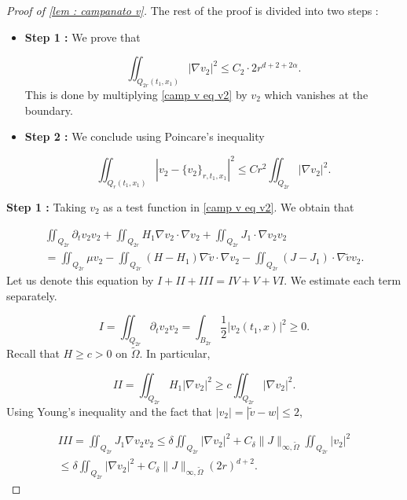 \documentclass[reqno,12pt,twoside]{amsart}
\numberwithin{equation}{section} \numberwithin{theorem}{section}
\numberwithin{proposition}{section} \numberwithin{lemma}{section}
\numberwithin{corollary}{section}
\numberwithin{definition}{section} \numberwithin{remark}{section}
\begin{document}
\begin{proof}[Proof of \autoref{lem : campanato v}]
The rest of the proof is divided into two steps : 

\begin{itemize}
\item[$\bullet$] \textbf{Step 1 :} We prove that 

\[\iint_{Q_{2r}(t_1, x_1)} |\nabla v_2|^2 \leqslant C_2\cdot  2r^{d+2+2\alpha}.\]
This is done by multiplying \eqref{camp v eq v2} by $v_2$ which vanishes at the boundary. 

\item[$\bullet$] \textbf{Step 2 :} We conclude using Poincare's inequality 

\[\iint_{Q_{r}(t_1, x_1)} |v_2 -\{v_2\}_{r, t_1,x_1}|^2 \leqslant C r^2 \iint_{Q_{2r}} |\nabla v_2|^2.\]
\end{itemize}

\medskip

\textbf{Step 1 :} Taking $v_2$ as a test function in \eqref{camp v eq v2}. We obtain that 

\begin{multline}
\iint_{Q_{2r}} \partial_t v_2 v_2 + \iint_{Q_{2r}} H_1\nabla v_2\cdot \nabla v_2 +\iint_{Q_{2r}}  J_1\cdot \nabla v_2 v_2 \\
= \iint_{Q_{2r}} \mu v_2 - \iint_{Q_{2r}} (H-H_1) \nabla \widetilde{v} \cdot \nabla v_2 - \iint_{Q_{2r}} (J-J_1)\cdot \nabla \widetilde{v} v_2.
\end{multline} 
Let us denote this equation by $I +II +III = IV +V +VI$. We estimate each term separately. 

\begin{equation}\label{camp I}
I =\iint_{Q_{2r}} \partial_t v_2 v_2 = \int_{B_{2r}} \frac{1}{2} |v_2 (t_1, x)|^2 \geqslant 0. 
\end{equation}
Recall that $H \geqslant c >0$ on $\widetilde{\Omega}$. In particular, 

\begin{equation}\label{camp II}
II = \iint_{Q_{2r}} H_1 |\nabla v_2|^2 \geqslant c\iint_{Q_{2r}} |\nabla v_2|^2. 
\end{equation}
Using Young's inequality and the fact that $|v_2| = |\widetilde{v} -w| \leqslant 2$, 

\begin{multline}\label{camp III}
III= \iint_{Q_{2r}}  J_1 \nabla v_2 v_2 \leqslant \delta \iint_{Q_{2r}} |\nabla v_2|^2 + C_\delta \|J\|_{\infty,\widetilde{\Omega}} \iint_{Q_{2r}} |v_2|^2\\
 \leqslant \delta \iint_{Q_{2r}} |\nabla v_2|^2 + C_\delta \|J\|_{\infty,\widetilde{\Omega}} (2r)^{d+2}.
\end{multline}


\end{proof}
\end{document}

